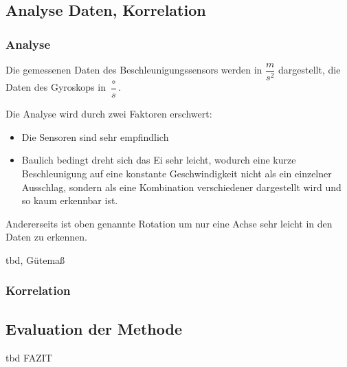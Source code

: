 \subsection{Analyse Daten, Korrelation}
\subsubsection{Analyse}
Die gemessenen Daten des Beschleunigungssensors werden in $\dfrac{m}{s^{2}}$ 
dargestellt, die Daten des Gyroskops in $\dfrac{\circ}{s}$.

Die Analyse wird durch zwei Faktoren erschwert:
\begin{itemize}
	\item Die Sensoren sind sehr empfindlich
	\item Baulich bedingt dreht sich das Ei sehr leicht, wodurch eine kurze Beschleunigung auf eine konstante Geschwindigkeit nicht als ein einzelner Ausschlag, sondern als eine Kombination verschiedener dargestellt wird und so kaum erkennbar ist.
\end{itemize}
Andererseits ist oben genannte Rotation um nur eine Achse sehr leicht in den Daten zu erkennen.

tbd,  Gütemaß

\subsubsection{Korrelation}


\subsection{Evaluation der Methode}
tbd FAZIT


